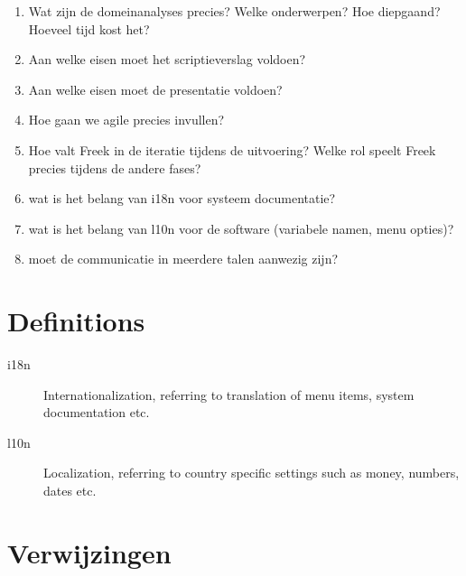 \documentclass[a4paper,11pt,twoside,draft]{article}
\begin{document}
\begin{enumerate}
 \item Wat zijn de domeinanalyses precies? Welke onderwerpen? Hoe diepgaand? Hoeveel tijd kost het?
 \item Aan welke eisen moet het scriptieverslag voldoen?
 \item Aan welke eisen moet de presentatie voldoen?
 \item Hoe gaan we agile precies invullen?
 \item Hoe valt Freek in de iteratie tijdens de uitvoering? Welke rol speelt Freek precies tijdens de andere fases?
 \item wat is het belang van i18n voor systeem documentatie?
 \item wat is het belang van l10n voor de software (variabele namen, menu opties)?
 \item moet de communicatie in meerdere talen aanwezig zijn?
\end{enumerate}


\appendix
\section{Definitions}

\begin{description}
 \item[i18n] Internationalization, referring to translation of menu items, system documentation etc.
 \item[l10n] Localization, referring to country specific settings such as money, numbers, dates etc.
\end{description}
\section{Verwijzingen}


\end{document}

